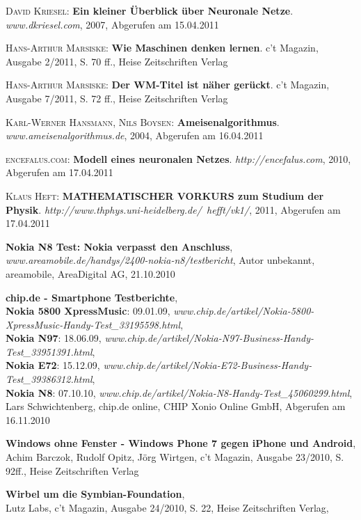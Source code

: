 \begin{thebibliography}{---}

  \textsc{David Kriesel}: 
  \textbf{Ein kleiner Überblick über Neuronale Netze}.
  \emph{www.dkriesel.com}, 2007, Abgerufen am 15.04.2011



  \textsc{Hans-Arthur Marsiske}: 
  \textbf{Wie Maschinen denken lernen}.
  c't Magazin, Ausgabe 2/2011, S. 70 ff., Heise Zeitschriften Verlag

  \textsc{Hans-Arthur Marsiske}: 
  \textbf{Der WM-Titel ist näher gerückt}.
  c't Magazin, Ausgabe 7/2011, S. 72 ff., Heise Zeitschriften Verlag

  \textsc{Karl-Werner Hansmann, Nils Boysen}: 
  \textbf{Ameisenalgorithmus}.
  \emph{www.ameisenalgorithmus.de}, 2004, Abgerufen am 16.04.2011


  \textsc{encefalus.com}: 
  \textbf{Modell eines neuronalen Netzes}.
  \emph{http://encefalus.com}, 2010, Abgerufen am 17.04.2011
  
  \textsc{Klaus Heft}: 
  \textbf{MATHEMATISCHER VORKURS zum Studium der Physik}.
  \emph{http://www.thphys.uni-heidelberg.de/~hefft/vk1/}, 2011, Abgerufen am 17.04.2011

	
	\textbf{Nokia N8 Test: Nokia verpasst den Anschluss}, \\
	\emph{www.areamobile.de/handys/2400-nokia-n8/testbericht},
	Autor unbekannt, areamobile, AreaDigital AG, 21.10.2010
		
	\textbf{chip.de - Smartphone Testberichte},\\
	\textbf{Nokia 5800 XpressMusic}: 09.01.09, \emph{www.chip.de/artikel/Nokia-5800-XpressMusic-Handy-Test\_33195598.html},\\
	\textbf{Nokia N97}: 18.06.09, \emph{www.chip.de/artikel/Nokia-N97-Business-Handy-Test\_33951391.html},\\
	\textbf{Nokia E72}: 15.12.09, \emph{www.chip.de/artikel/Nokia-E72-Business-Handy-Test\_39386312.html},\\
	\textbf{Nokia N8}: 07.10.10, \emph{www.chip.de/artikel/Nokia-N8-Handy-Test\_45060299.html},\\
	Lars Schwichtenberg, chip.de online, CHIP Xonio Online GmbH, Abgerufen am 16.11.2010 
	
	\textbf{Windows ohne Fenster - Windows Phone 7 gegen iPhone und Android},\\
	Achim Barczok, Rudolf Opitz, Jörg Wirtgen, c't Magazin, Ausgabe 23/2010, S. 92ff., Heise Zeitschriften Verlag

	\textbf{Wirbel um die Symbian-Foundation},\\
	Lutz Labs, c't Magazin, Ausgabe 24/2010, S. 22, Heise Zeitschriften Verlag,
	
\end{thebibliography}


